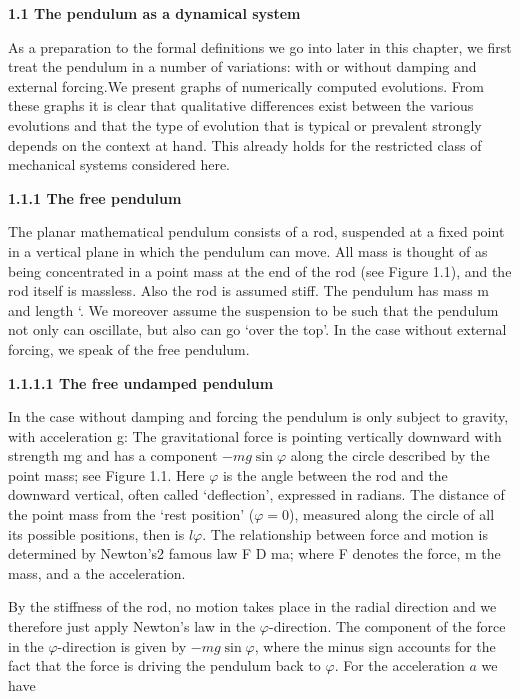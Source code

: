 \documentclass[12pt]{article}
\begin{document}
\hfill

\textbf{1.1 The pendulum as a dynamical system}

\hfill

As a preparation to the formal definitions we go into later in this chapter, we first
treat the pendulum in a number of variations: with or without damping and external
forcing.We present graphs of numerically computed evolutions. From these graphs
it is clear that qualitative differences exist between the various evolutions and that
the type of evolution that is typical or prevalent strongly depends on the context
at hand. This already holds for the restricted class of mechanical systems considered
here.

\hfill

\textbf{1.1.1 The free pendulum}

\hfill

The planar mathematical pendulum consists of a rod, suspended at a fixed point in
a vertical plane in which the pendulum can move. All mass is thought of as being
concentrated in a point mass at the end of the rod (see Figure 1.1), and the rod itself
is massless. Also the rod is assumed stiff. The pendulum has mass m and length `.
We moreover assume the suspension to be such that the pendulum not only can
oscillate, but also can go ‘over the top’. In the case without external forcing, we
speak of the free pendulum.

\hfill

\textbf{1.1.1.1 The free undamped pendulum}

\hfill


In the case without damping and forcing the pendulum is only subject to gravity,
with acceleration g: The gravitational force is pointing vertically downward with
strength mg and has a component $-mg \sin \varphi$ along the circle described by the
point mass; see Figure 1.1. Here $\varphi$ is the angle between the rod and the downward
vertical, often called ‘deflection’, expressed in radians. The distance of the point
mass from the ‘rest position’ ($\varphi = 0$), measured along the circle of all its possible
positions, then is $l \varphi$. The relationship between force and motion is determined by
Newton’s2 famous law F D ma; where F denotes the force, m the mass, and a the
acceleration.

\hfill

By the stiffness of the rod, no motion takes place in the radial direction and we
therefore just apply Newton’s law in the $\varphi$-direction. The component of the force in
the $\varphi$-direction is given by $-mg \sin \varphi$, where the minus sign accounts for the fact
that the force is driving the pendulum back to $\varphi$. For the acceleration $a$ we have
\end{document}
